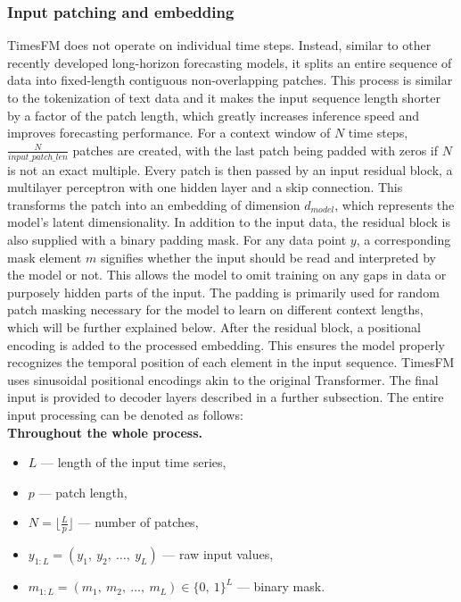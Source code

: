 \subsubsection{Input patching and embedding}

TimesFM does not operate on individual time steps. Instead, similar to other recently developed long-horizon forecasting models,  it splits an entire sequence of data into fixed-length contiguous non-overlapping patches. This process is similar to the tokenization of text data and it makes the input sequence length shorter by a factor of the patch length, which greatly increases inference speed and improves forecasting performance. 
For a context window of $ N $ time steps, $ \frac{N}{\mathit{input\_patch\_len}}$ patches are created, with the last patch being padded with zeros if $ N $ is not an exact multiple. Every patch is then passed by an input residual block, a multilayer perceptron with one hidden layer and a skip connection. This transforms the patch into an embedding of dimension $ \mathit{d_{model}} $, which represents the model's latent dimensionality. In addition to the input data, the residual block is also supplied with a binary padding mask. For any data point $ y $, a corresponding mask element $ m $ signifies whether the input should be read and interpreted by the model or not. This allows the model to omit training on any gaps in data or purposely hidden parts of the input. The padding is primarily used for random patch masking necessary for the model to learn on different context lengths, which will be further explained below. After the residual block, a positional encoding is added to the processed embedding. This ensures the model properly recognizes the temporal position of each element in the input sequence. TimesFM uses sinusoidal positional encodings akin to the original Transformer. The final input is provided to decoder layers described in a further subsection.
The entire input processing can be denoted as follows:
\\\textbf{Throughout the whole process.}
\begin{itemize}
    \item $ L $ --- length of the input time series,
    \item $ p $ --- patch length,
    \item $ N = \lfloor\frac{L}{p}\rfloor$ --- number of patches,
    \item $ y_{1:L} = (y_1,\ y_2,\ \ldots,\ y_L)$ --- raw input values,
    \item $ m_{1:L} = \left( m_1,\ m_2,\ \ldots,\ m_L \right) \in \{0,\ 1\}^L $ --- binary mask.
\end{itemize}
